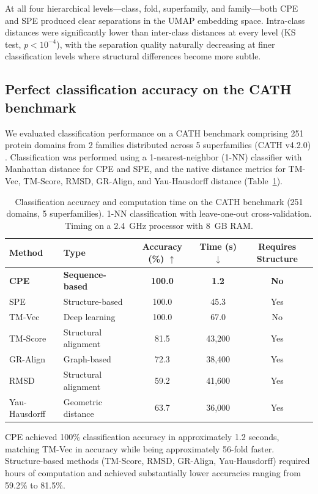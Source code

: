\documentclass[11pt]{article}
\begin{document}
At all four hierarchical levels---class, fold, superfamily, and family---both CPE and SPE produced clear separations in the UMAP embedding space. Intra-class distances were significantly lower than inter-class distances at every level (KS test, $p < 10^{-4}$), with the separation quality naturally decreasing at finer classification levels where structural differences become more subtle.

\subsection{Perfect classification accuracy on the CATH benchmark}

We evaluated classification performance on a CATH benchmark comprising 251 protein domains from 2 families distributed across 5 superfamilies (CATH v4.2.0) \citep{sillitoe2019}. Classification was performed using a 1-nearest-neighbor (1-NN) classifier with Manhattan distance for CPE and SPE, and the native distance metrics for TM-Vec, TM-Score, RMSD, GR-Align, and Yau-Hausdorff distance (Table~\ref{tab:cath}).

\begin{table}[H]
\centering
\caption{Classification accuracy and computation time on the CATH benchmark (251 domains, 5 superfamilies). 1-NN classification with leave-one-out cross-validation. Timing on a 2.4~GHz processor with 8~GB RAM.}
\label{tab:cath}
\begin{tabular}{llccc}
\toprule
\textbf{Method} & \textbf{Type} & \textbf{Accuracy (\%)} $\uparrow$ & \textbf{Time (s)} $\downarrow$ & \textbf{Requires Structure} \\
\midrule
\textbf{CPE} & \textbf{Sequence-based} & \textbf{100.0} & \textbf{1.2} & \textbf{No} \\
SPE & Structure-based & 100.0 & 45.3 & Yes \\
TM-Vec & Deep learning & 100.0 & 67.0 & No \\
TM-Score & Structural alignment & 81.5 & 43{,}200 & Yes \\
GR-Align & Graph-based & 72.3 & 38{,}400 & Yes \\
RMSD & Structural alignment & 59.2 & 41{,}600 & Yes \\
Yau-Hausdorff & Geometric distance & 63.7 & 36{,}000 & Yes \\
\bottomrule
\end{tabular}
\end{table}

CPE achieved 100\% classification accuracy in approximately 1.2 seconds, matching TM-Vec in accuracy while being approximately 56-fold faster. Structure-based methods (TM-Score, RMSD, GR-Align, Yau-Hausdorff) required hours of computation and achieved substantially lower accuracies ranging from 59.2\% to 81.5\%.
\end{document}
